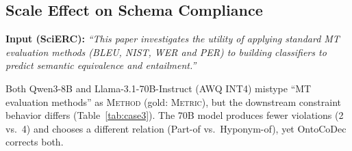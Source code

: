 \begin{table}[h]
\centering
\small
\caption{Layer~1 eliminates RV violations; Layer~2 corrects DR types on DocRED.}
\label{tab:case2}
\end{table}

\subsection{Scale Effect on Schema Compliance}
\label{app:case-scale}

\noindent\textbf{Input (SciERC):} \textit{``This paper investigates the utility of applying standard MT evaluation methods (BLEU, NIST, WER and PER) to building classifiers to predict semantic equivalence and entailment.''}

Both Qwen3-8B and Llama-3.1-70B-Instruct (AWQ INT4) mistype ``MT evaluation methods'' as \textsc{Method} (gold: \textsc{Metric}), but the downstream constraint behavior differs (Table~\ref{tab:case3}). The 70B model produces fewer violations (2 vs.\ 4) and chooses a different relation (Part-of vs.\ Hyponym-of), yet OntoCoDec corrects both.

